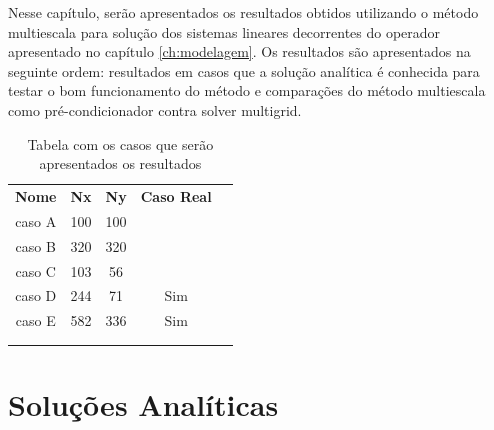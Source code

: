 Nesse capítulo, serão apresentados os resultados obtidos utilizando o método multiescala para solução dos sistemas lineares decorrentes do operador apresentado no capítulo \ref{ch:modelagem}. Os resultados são apresentados na seguinte ordem: resultados em casos que a solução analítica é conhecida para testar o bom funcionamento do método e comparações do método multiescala como pré-condicionador contra solver multigrid.


\begin{table}[]
\caption{Tabela com os casos que serão apresentados os resultados}
\centering
\begin{tabular}{ccccl}
\cline{1-4}
\multicolumn{1}{|c|}{\textbf{Nome}} & \multicolumn{1}{c|}{\textbf{Nx}} & \multicolumn{1}{c|}{\textbf{Ny}} & \multicolumn{1}{c|}{\textbf{Caso Real}} &  \\ \cline{1-4}
\multicolumn{1}{|c|}{caso A}        & \multicolumn{1}{c|}{100}         & \multicolumn{1}{c|}{100}         & \multicolumn{1}{c|}{}                   &  \\ \cline{1-4}
\multicolumn{1}{|c|}{caso B}        & \multicolumn{1}{c|}{320}         & \multicolumn{1}{c|}{320}         & \multicolumn{1}{c|}{}                   &  \\ \cline{1-4}
\multicolumn{1}{|c|}{caso C}        & \multicolumn{1}{c|}{103}         & \multicolumn{1}{c|}{56}          & \multicolumn{1}{c|}{}                   &  \\ \cline{1-4}
\multicolumn{1}{|c|}{caso D}        & \multicolumn{1}{c|}{244}            & \multicolumn{1}{c|}{71}            & \multicolumn{1}{c|}{Sim}                &  \\ \cline{1-4}
\multicolumn{1}{|c|}{caso  E}       & \multicolumn{1}{c|}{582}         & \multicolumn{1}{c|}{336}         & \multicolumn{1}{c|}{Sim}                &  \\ \cline{1-4}
\multicolumn{1}{l}{}                & \multicolumn{1}{l}{}             & \multicolumn{1}{l}{}             & \multicolumn{1}{l}{}                    &  \\
\multicolumn{1}{l}{}                & \multicolumn{1}{l}{}             & \multicolumn{1}{l}{}             & \multicolumn{1}{l}{}                    & 
\end{tabular}
\end{table}


\section{Soluções Analíticas}

